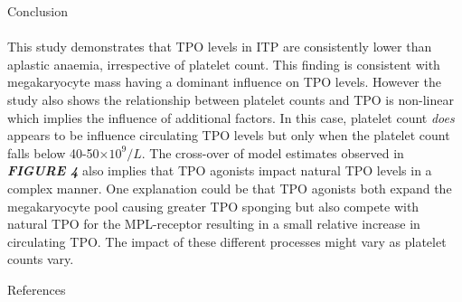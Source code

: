 \documentclass[landscape,a0paper,fontscale=0.285]{beamer} %
\newlength{\onecolwid}
\begin{document}
\begin{frame}[t]
\begin{columns}[t]
\begin{column}{\onecolwid}
\begin{block}{Conclusion}
\paragraph{} This study demonstrates that TPO levels in ITP are consistently lower than aplastic anaemia, irrespective of platelet count. This finding is consistent with megakaryocyte mass having a dominant influence on TPO levels. However the study also shows the relationship between platelet counts and TPO is non-linear which implies the influence of additional factors. In this case, platelet count \emph{does} appears to be influence circulating TPO levels but only when the platelet count falls below 40-50$\times10^9/L$. The cross-over of model estimates observed in \textbf{\emph{FIGURE 4}} also implies that TPO agonists impact natural TPO levels in a complex manner. One explanation could be that TPO agonists both expand the megakaryocyte pool causing greater TPO sponging but also compete with natural TPO for the MPL-receptor resulting in a small relative increase in circulating TPO. The impact of these different processes might vary as platelet counts vary. 

\end{block}






\begin{block}{References}

\small{
\vspace{0.2in}}


\end{block}
\end{column}
\end{columns}
\end{frame}
\end{document}
